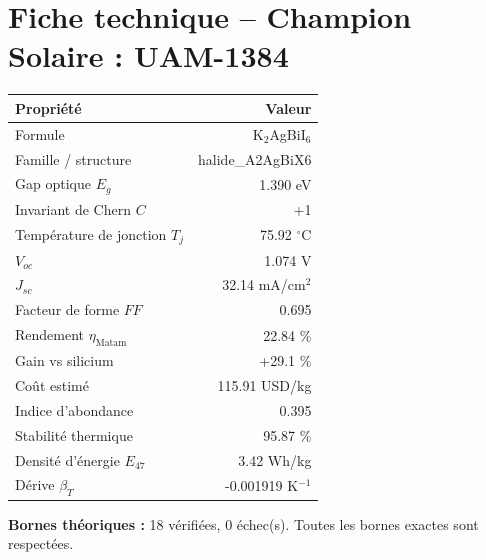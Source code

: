 \documentclass[11pt,a4paper,french]{article}
\begin{document}
\section{Fiche technique -- Champion Solaire : UAM-1384}
\begin{tcolorbox}[colback=green!5,colframe=green!50!black,title=Matériau K$_{2}$AgBiI$_{6}$ --- photovoltaïque]
\begin{tabular}{lr}
\toprule
Propriété & Valeur \\
\midrule
Formule & K$_{2}$AgBiI$_{6}$ \\
Famille / structure & halide\_A2AgBiX6 \\
Gap optique $E_g$ & 1.390 eV \\
Invariant de Chern $C$ & +1 \\
Température de jonction $T_j$ & 75.92 $^\circ$C \\
$V_{oc}$ & 1.074 V \\
$J_{sc}$ & 32.14 mA/cm$^2$ \\
Facteur de forme $FF$ & 0.695 \\
Rendement $\eta_{\mathrm{{Matam}}}$ & 22.84 \% \\
Gain vs silicium & +29.1 \% \\
Coût estimé & 115.91 USD/kg \\
Indice d'abondance & 0.395 \\
Stabilité thermique & 95.87 \% \\
Densité d'énergie $E_{{47}}$ & 3.42 Wh/kg \\
Dérive $\beta_T$ & -0.001919 K$^{-1}$ \\
\bottomrule
\end{tabular}

\noindent\textbf{Bornes théoriques :} 18 vérifiées, 0 échec(s). Toutes les bornes exactes sont respectées.
\end{tcolorbox}
\end{document}
